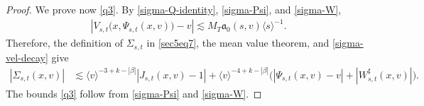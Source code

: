 \documentclass[reqno,11pt]{amsart}
\numberwithin{equation}{section}
\begin{document}
\begin{proof}
	We prove now \eqref{q3}. By \eqref{sigma-Q-identity},
	\eqref{sigma-Psi}, and \eqref{sigma-W},
	\begin{align}
	&\left|
	V_{s,t}\bigl(x,\Psi_{s,t}(x,v)\bigr)-v
	\right|
	\lesssim
	M_T\mathfrak a_0(s,v)\langle s\rangle^{-1}.
	\label{sigma-V}
	\end{align}
	Therefore, the definition of $\Sigma_{s,t}$ in \eqref{sec5eq7}, the mean value theorem,
	and \eqref{sigma-vel-decay} give
	\begin{align}
	|\Sigma_{s,t}(x,v)|
	&\lesssim
	\langle v\rangle^{-3+k-|\beta|}
	|J_{s,t}(x,v)-1|+\langle v\rangle^{-4+k-|\beta|}
	\Big(|\Psi_{s,t}(x,v)-v|+|W^\sharp_{s,t}(x,v)|
	\Big).\label{sigma-basic}
	\end{align}
	The bounds \eqref{q3} follow from \eqref{sigma-Psi} and \eqref{sigma-W}.


\end{proof}
\end{document}
